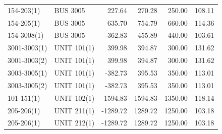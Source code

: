 \documentclass[10pt]{report}
\begin{document}
\begin{table}[H]
{\begin{tabular}{llrrrr}
154-203(1) & BUS 3005 & 227.64 & 270.28 & 250.00 & 108.11 \\
154-205(1) & BUS 3005 & 635.70 & 754.79 & 660.00 & 114.36 \\
154-3008(1) & BUS 3005 & -362.83 & 455.89 & 440.00 & 103.61 \\
3001-3003(1) & UNIT 101(1) & 399.98 & 394.87 & 300.00 & 131.62 \\
3001-3003(2) & UNIT 101(1) & 399.98 & 394.87 & 300.00 & 131.62 \\
3003-3005(1) & UNIT 101(1) & -382.73 & 395.53 & 350.00 & 113.01 \\
3003-3005(2) & UNIT 101(1) & -382.73 & 395.53 & 350.00 & 113.01 \\
101-151(1) & UNIT 102(1) & 1594.83 & 1594.83 & 1350.00 & 118.14 \\
205-206(1) & UNIT 211(1) & -1289.72 & 1289.72 & 1250.00 & 103.18 \\
205-206(1) & UNIT 212(1) & -1289.72 & 1289.72 & 1250.00 & 103.18 \\
\bottomrule
\end{tabular}}
\end{table}
\end{document}
